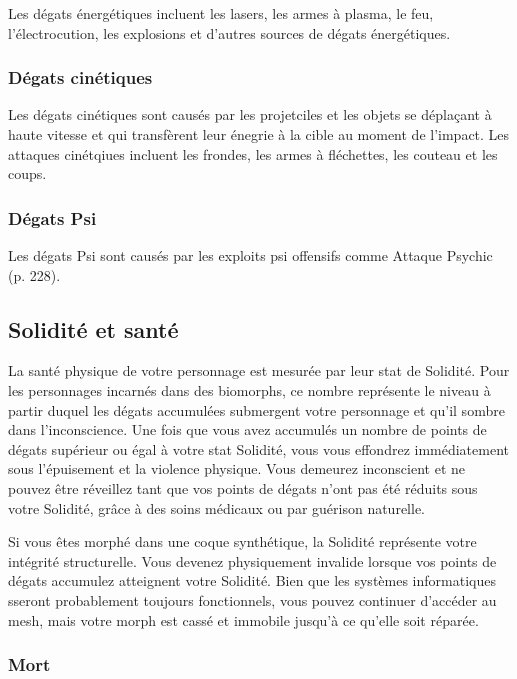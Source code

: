 Les dégats énergétiques incluent les lasers, les armes à plasma, le feu, l'électrocution, les explosions et d'autres sources de dégats énergétiques. 

\subsubsection{Dégats cinétiques} 

Les dégats cinétiques sont causés par les projetciles et les objets se déplaçant à haute vitesse et qui transfèrent leur énegrie à la cible au moment de l'impact. Les attaques cinétqiues incluent les frondes, les armes à fléchettes, les couteau et les coups. 

\subsubsection{Dégats Psi} 

Les dégats Psi sont causés par les exploits psi offensifs comme Attaque Psychic (p. 228). 



\subsection{Solidité et santé} \label{sec:durability-health} 

La santé physique de votre personnage est mesurée par leur stat de Solidité. Pour les personnages incarnés dans des biomorphs, ce nombre représente le niveau à partir duquel les dégats accumulées submergent votre personnage et qu'il sombre dans l'inconscience. Une fois que vous avez accumulés un nombre de points de dégats supérieur ou égal à votre stat Solidité, vous vous effondrez immédiatement sous l'épuisement et la violence physique. Vous demeurez inconscient et ne pouvez être réveillez tant que vos points de dégats n'ont pas été réduits sous votre Solidité, grâce à des soins médicaux ou par guérison naturelle. 

Si vous êtes morphé dans une coque synthétique, la Solidité représente votre intégrité structurelle. Vous devenez physiquement invalide lorsque vos points de dégats accumulez atteignent votre Solidité. Bien que les systèmes informatiques sseront probablement toujours fonctionnels, vous pouvez continuer d'accéder au mesh, mais votre morph est cassé et immobile jusqu'à ce qu'elle soit réparée. 



\subsubsection{Mort} 

